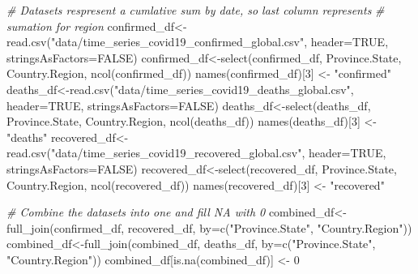 \documentclass[
]{article}
\newenvironment{Shaded}{\begin{snugshade}}{\end{snugshade}}
\newcommand{\AttributeTok}[1]{\textcolor[rgb]{0.77,0.63,0.00}{#1}}
\newcommand{\CommentTok}[1]{\textcolor[rgb]{0.56,0.35,0.01}{\textit{#1}}}
\newcommand{\ConstantTok}[1]{\textcolor[rgb]{0.00,0.00,0.00}{#1}}
\newcommand{\DecValTok}[1]{\textcolor[rgb]{0.00,0.00,0.81}{#1}}
\newcommand{\FunctionTok}[1]{\textcolor[rgb]{0.00,0.00,0.00}{#1}}
\newcommand{\NormalTok}[1]{#1}
\newcommand{\OtherTok}[1]{\textcolor[rgb]{0.56,0.35,0.01}{#1}}
\newcommand{\StringTok}[1]{\textcolor[rgb]{0.31,0.60,0.02}{#1}}
\begin{document}
\begin{Shaded}
\begin{Highlighting}[]
\CommentTok{\# Datasets respresent a cumlative sum by date, so last column represents }
\CommentTok{\# sumation for region}
\NormalTok{confirmed\_df}\OtherTok{\textless{}{-}}\FunctionTok{read.csv}\NormalTok{(}\StringTok{"data/time\_series\_covid19\_confirmed\_global.csv"}\NormalTok{, }
                       \AttributeTok{header=}\ConstantTok{TRUE}\NormalTok{, }\AttributeTok{stringsAsFactors=}\ConstantTok{FALSE}\NormalTok{)}
\NormalTok{confirmed\_df}\OtherTok{\textless{}{-}}\FunctionTok{select}\NormalTok{(confirmed\_df, Province.State, }
\NormalTok{                     Country.Region, }\FunctionTok{ncol}\NormalTok{(confirmed\_df))}
\FunctionTok{names}\NormalTok{(confirmed\_df)[}\DecValTok{3}\NormalTok{] }\OtherTok{\textless{}{-}} \StringTok{"confirmed"}
\NormalTok{deaths\_df}\OtherTok{\textless{}{-}}\FunctionTok{read.csv}\NormalTok{(}\StringTok{"data/time\_series\_covid19\_deaths\_global.csv"}\NormalTok{, }
                    \AttributeTok{header=}\ConstantTok{TRUE}\NormalTok{, }\AttributeTok{stringsAsFactors=}\ConstantTok{FALSE}\NormalTok{)}
\NormalTok{deaths\_df}\OtherTok{\textless{}{-}}\FunctionTok{select}\NormalTok{(deaths\_df, Province.State, }
\NormalTok{                  Country.Region, }\FunctionTok{ncol}\NormalTok{(deaths\_df))}
\FunctionTok{names}\NormalTok{(deaths\_df)[}\DecValTok{3}\NormalTok{] }\OtherTok{\textless{}{-}} \StringTok{"deaths"}
\NormalTok{recovered\_df}\OtherTok{\textless{}{-}}\FunctionTok{read.csv}\NormalTok{(}\StringTok{"data/time\_series\_covid19\_recovered\_global.csv"}\NormalTok{, }
                       \AttributeTok{header=}\ConstantTok{TRUE}\NormalTok{, }\AttributeTok{stringsAsFactors=}\ConstantTok{FALSE}\NormalTok{)}
\NormalTok{recovered\_df}\OtherTok{\textless{}{-}}\FunctionTok{select}\NormalTok{(recovered\_df, Province.State, }
\NormalTok{                     Country.Region, }\FunctionTok{ncol}\NormalTok{(recovered\_df))}
\FunctionTok{names}\NormalTok{(recovered\_df)[}\DecValTok{3}\NormalTok{] }\OtherTok{\textless{}{-}} \StringTok{"recovered"}

\CommentTok{\# Combine the datasets into one and fill NA with 0}
\NormalTok{combined\_df}\OtherTok{\textless{}{-}}\FunctionTok{full\_join}\NormalTok{(confirmed\_df, recovered\_df, }
                       \AttributeTok{by=}\FunctionTok{c}\NormalTok{(}\StringTok{"Province.State"}\NormalTok{, }\StringTok{"Country.Region"}\NormalTok{))}
\NormalTok{combined\_df}\OtherTok{\textless{}{-}}\FunctionTok{full\_join}\NormalTok{(combined\_df, deaths\_df, }
                       \AttributeTok{by=}\FunctionTok{c}\NormalTok{(}\StringTok{"Province.State"}\NormalTok{, }\StringTok{"Country.Region"}\NormalTok{))}
\NormalTok{combined\_df[}\FunctionTok{is.na}\NormalTok{(combined\_df)] }\OtherTok{\textless{}{-}} \DecValTok{0}


\end{Highlighting}
\end{Shaded}
\end{document}
